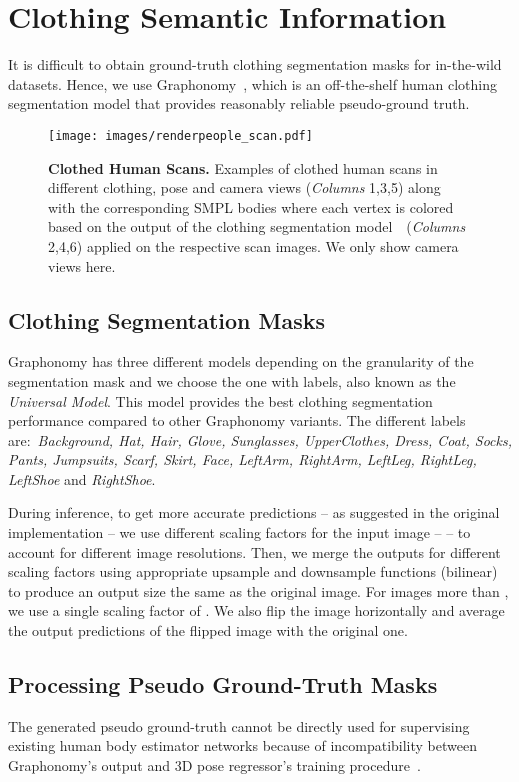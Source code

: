 \documentclass[10pt,twocolumn,letterpaper]{article}
\begin{document}
\section{Clothing Semantic Information}
It is difficult to obtain ground-truth clothing segmentation masks for in-the-wild datasets. Hence, we use  Graphonomy~\cite{graphonomy}, which is an off-the-shelf human clothing segmentation model that provides reasonably reliable pseudo-ground truth. 

\begin{figure*}[t]
    \texttt{[image: images/renderpeople\_scan.pdf]}
    \caption{\textbf{Clothed Human Scans.} Examples of clothed human scans in different clothing, pose and camera views (\emph{Columns} 1,3,5) along with the corresponding SMPL bodies where each vertex is colored based on the output of the clothing segmentation model~\cite{graphonomy}~(\emph{Columns} 2,4,6) applied on the respective scan images. We only show  camera views here. }
    \label{fig:sem_prior}
\end{figure*}
\subsection{Clothing Segmentation Masks} 
Graphonomy has three different models depending on the granularity of the segmentation mask and we choose the one with  labels, also known as the \emph{Universal Model}. This model provides the best clothing segmentation performance compared to other Graphonomy variants. The different labels are:~\emph{Background, Hat, Hair, Glove, Sunglasses, UpperClothes, Dress, Coat, Socks, Pants, Jumpsuits, Scarf, Skirt, Face, LeftArm, RightArm, LeftLeg, RightLeg, LeftShoe} and \emph{RightShoe}. 

During inference, to get more accurate predictions -- as suggested in the original implementation -- we use  different scaling factors for the input image --  -- to account for different image resolutions. Then, we merge the outputs for different scaling factors using appropriate upsample and downsample functions (bilinear) to produce an output size the same as the original image. For images more than , we use a single scaling factor of . We also flip the image horizontally and average the output predictions of the flipped image with the original one.

\subsection{Processing Pseudo Ground-Truth Masks} 
\label{subsec:proc}
The generated pseudo ground-truth cannot be directly used for supervising existing human body estimator networks because of incompatibility between Graphonomy's output and 3D pose regressor's training procedure~\cite{hmr}.
\end{document}
